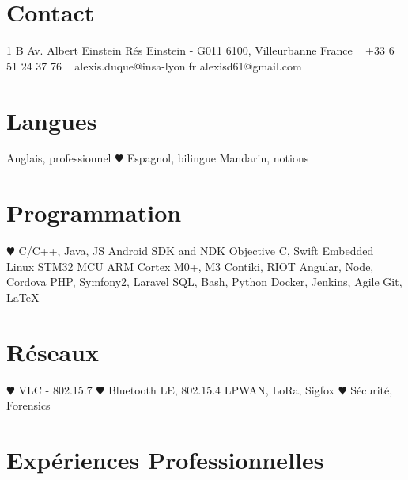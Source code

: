 \documentclass[]{cv-style}          %
\begin{document}
\lastupdated


\begin{aside}
%
\section{Contact}
1 B Av. Albert Einstein
Rés Einstein - G011
6100, Villeurbanne
France
~
+33 6 51 24 37 76
~
alexis.duque@insa-lyon.fr
alexisd61@gmail.com
%
\section{Langues}
Anglais, professionnel
{\color{red} $\varheartsuit$} Espagnol, bilingue
Mandarin, notions
%
\section{Programmation}
{\color{red} $\varheartsuit$} C/C++, Java, JS
Android SDK and NDK
Objective C, Swift
Embedded Linux
STM32 MCU
ARM Cortex M0+, M3
Contiki, RIOT
Angular, Node, Cordova
PHP, Symfony2, Laravel
SQL, Bash, Python
Docker, Jenkins, Agile
Git, \LaTeX{}
%
\section{Réseaux}
{\color{red} $\varheartsuit$} VLC - 802.15.7
{\color{red} $\varheartsuit$} Bluetooth LE, 802.15.4
LPWAN, LoRa, Sigfox
{\color{red} $\varheartsuit$} Sécurité, Forensics
\end{aside}



 \vspace{0.15cm}

\section{Expériences Professionnelles}
\end{document}
